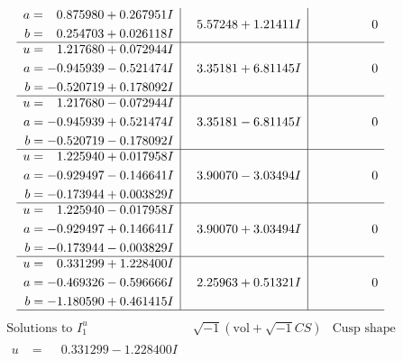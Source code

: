 \documentclass[1p]{elsarticle_modified}
\theoremstyle{definition}
\newcommand{\I}{\sqrt{-1}}
\begin{document}
$$\begin{array}{c|c|c}
\begin{aligned}
a &= \phantom{-}0.875980 + 0.267951 I \\
b &= \phantom{-}0.254703 + 0.026118 I\end{aligned}
 & \phantom{-}5.57248 + 1.21411 I & \phantom{-0.000000 } 0 \\ \hline\begin{aligned}
u &= \phantom{-}1.217680 + 0.072944 I \\
a &= -0.945939 - 0.521474 I \\
b &= -0.520719 + 0.178092 I\end{aligned}
 & \phantom{-}3.35181 + 6.81145 I & \phantom{-0.000000 } 0 \\ \hline\begin{aligned}
u &= \phantom{-}1.217680 - 0.072944 I \\
a &= -0.945939 + 0.521474 I \\
b &= -0.520719 - 0.178092 I\end{aligned}
 & \phantom{-}3.35181 - 6.81145 I & \phantom{-0.000000 } 0 \\ \hline\begin{aligned}
u &= \phantom{-}1.225940 + 0.017958 I \\
a &= -0.929497 - 0.146641 I \\
b &= -0.173944 + 0.003829 I\end{aligned}
 & \phantom{-}3.90070 - 3.03494 I & \phantom{-0.000000 } 0 \\ \hline\begin{aligned}
u &= \phantom{-}1.225940 - 0.017958 I \\
a &= -0.929497 + 0.146641 I \\
b &= -0.173944 - 0.003829 I\end{aligned}
 & \phantom{-}3.90070 + 3.03494 I & \phantom{-0.000000 } 0 \\ \hline\begin{aligned}
u &= \phantom{-}0.331299 + 1.228400 I \\
a &= -0.469326 - 0.596666 I \\
b &= -1.180590 + 0.461415 I\end{aligned}
 & \phantom{-}2.25963 + 0.51321 I & \phantom{-0.000000 } 0\\
 \hline 
 \end{array}$$\newpage$$\begin{array}{c|c|c}  
\text{Solutions to }I^u_{1}& \I (\text{vol} + \sqrt{-1}CS) & \text{Cusp shape}\\
 \hline 
\begin{aligned}
u &= \phantom{-}0.331299 - 1.228400 I \\

\end{aligned}
\end{array}$$
\end{document}
